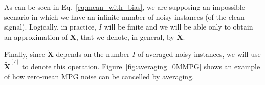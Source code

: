 \documentclass{article}
\begin{document}

As can be seen in Eq.~\ref{eq:mean_with_bias}, we are
supposing an impossible scenario in which we have an infinite number
of noisy instances (of the clean signal). Logically, in practice, $I$
will be finite and we will be able only to obtain an approximation of
${\mathbf X}$, that we denote, in general, by $\tilde{\mathbf
  X}$.

Finally, since $\tilde{\mathbf X}$ depends on the number $I$ of averaged
noisy instances, we will use $\tilde{\mathbf X}^{[I]}$ to denote this operation.
Figure~\ref{fig:averaging_0MMPG} shows an example of how zero-mean MPG
noise can be cancelled by averaging.
  
\end{document}
